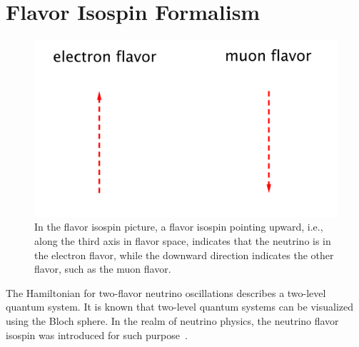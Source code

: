 \section{\label{chap:basics-sec:flavor-isospin-pic}Flavor Isospin Formalism}


\begin{figure}
    \centering
    \vspace*{-10pt}
    \includegraphics[width=\textwidth]{chapters/assets/basics/flavor-isospin-illus}
    \caption{In the flavor isospin picture, a flavor isospin pointing upward, i.e., along the third axis in flavor space, indicates that the neutrino is in the electron flavor, while the downward direction indicates the other flavor, such as the muon flavor.}
    \label{chap:basics-sec:flavor-isospin-pic-fig:flavor-isospin-illus}
\end{figure}

The Hamiltonian for two-flavor neutrino oscillations describes a two-level quantum system. It is known that two-level quantum systems can be visualized using the Bloch sphere. In the realm of neutrino physics, the neutrino flavor isospin was introduced for such purpose~\cite{Duan2006b}.

